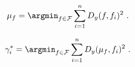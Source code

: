 \begin{equation}
  \mu_f = \argmin_{f \in \mathcal{F}} \sum_{i = 1}^{n} D_y(f, f_i)^2 \ .
  \label{eq:mean}
\end{equation}

\begin{equation}
  \gamma_{i}^{*} = \argmin_{f \in \mathcal{F}} \sum_{i = 1}^{n} D_y(\mu_f, f_i)^2 \ .
  \label{eq:warpi}
\end{equation}


